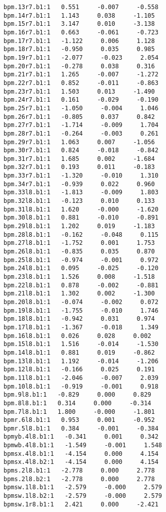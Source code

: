 \begin{verbatim}
bpm.13r7.b1:1   0.551     -0.007     -0.558
bpm.14r7.b1:1   1.143     0.038     -1.105
bpm.15r7.b1:1   3.147     0.010     -3.138
bpm.16r7.b1:1   0.663     -0.061     -0.723
bpm.17r7.b1:1   -1.122     0.006     1.128
bpm.18r7.b1:1   -0.950     0.035     0.985
bpm.19r7.b1:1   -2.077     -0.023     2.054
bpm.20r7.b1:1   -0.278     0.038     0.316
bpm.21r7.b1:1   1.265     -0.007     -1.272
bpm.22r7.b1:1   0.852     -0.011     -0.863
bpm.23r7.b1:1   1.503     0.013     -1.490
bpm.24r7.b1:1   0.161     -0.029     -0.190
bpm.25r7.b1:1   -1.050     -0.004     1.046
bpm.26r7.b1:1   -0.805     0.037     0.842
bpm.27r7.b1:1   -1.714     -0.009     1.704
bpm.28r7.b1:1   -0.264     -0.003     0.261
bpm.29r7.b1:1   1.063     0.007     -1.056
bpm.30r7.b1:1   0.824     -0.018     -0.842
bpm.31r7.b1:1   1.685     0.002     -1.684
bpm.32r7.b1:1   0.193     0.011     -0.183
bpm.33r7.b1:1   -1.320     -0.010     1.310
bpm.34r7.b1:1   -0.939     0.022     0.960
bpm.33l8.b1:1   -1.813     -0.009     1.803
bpm.32l8.b1:1   -0.123     0.010     0.133
bpm.31l8.b1:1   1.620     -0.000     -1.620
bpm.30l8.b1:1   0.881     -0.010     -0.891
bpm.29l8.b1:1   1.202     0.019     -1.183
bpm.28l8.b1:1   -0.162     -0.048     0.115
bpm.27l8.b1:1   -1.752     0.001     1.753
bpm.26l8.b1:1   -0.835     0.035     0.870
bpm.25l8.b1:1   -0.974     -0.001     0.972
bpm.24l8.b1:1   0.095     -0.025     -0.120
bpm.23l8.b1:1   1.526     0.008     -1.518
bpm.22l8.b1:1   0.878     -0.002     -0.881
bpm.21l8.b1:1   1.302     0.002     -1.300
bpm.20l8.b1:1   -0.074     -0.002     0.072
bpm.19l8.b1:1   -1.755     -0.010     1.746
bpm.18l8.b1:1   -0.942     0.031     0.974
bpm.17l8.b1:1   -1.367     -0.018     1.349
bpm.16l8.b1:1   0.026     0.028     0.002
bpm.15l8.b1:1   1.516     -0.014     -1.530
bpm.14l8.b1:1   0.881     0.019     -0.862
bpm.13l8.b1:1   1.192     -0.014     -1.206
bpm.12l8.b1:1   -0.166     0.025     0.191
bpm.11l8.b1:1   -2.046     -0.007     2.039
bpm.10l8.b1:1   -0.919     -0.001     0.918
bpm.9l8.b1:1   -0.829     0.000     0.829
bpm.8l8.b1:1   0.314     0.000     -0.314
bpm.7l8.b1:1   1.800     -0.000     -1.801
bpmr.6l8.b1:1   0.953     0.001     -0.952
bpmr.5l8.b1:1   0.384     -0.001     -0.384
bpmyb.4l8.b1:1   -0.341     0.001     0.342
bpmwb.4l8.b1:1   -1.549     -0.001     1.548
bpmsx.4l8.b1:1   -4.154     0.000     4.154
bpmsx.4l8.b2:1   -4.154     0.000     4.154
bpms.2l8.b1:1   -2.778     0.000     2.778
bpms.2l8.b2:1   -2.778     0.000     2.778
bpmsw.1l8.b1:1   -2.579     -0.000     2.579
bpmsw.1l8.b2:1   -2.579     -0.000     2.579
bpmsw.1r8.b1:1   2.421     0.000     -2.421

\end{verbatim}
